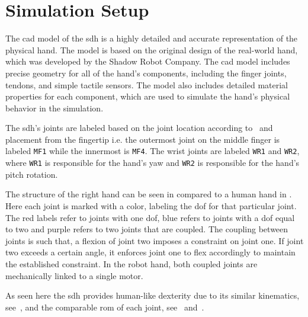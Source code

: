 \section{Simulation Setup}\label{sec:system-setup-simulation-setup}

The \gls{cad} model of the \gls{sdh} is a highly detailed and accurate representation of the physical hand. The model is based on the original design of the real-world hand, which was developed by the Shadow Robot Company. The \gls{cad} model includes precise geometry for all of the hand's components, including the finger joints, tendons, and simple tactile sensors. The model also includes detailed material properties for each component, which are used to simulate the hand's physical behavior in the simulation.\medskip

The \gls{sdh}'s joints are labeled based on the joint location according to~ and placement from the fingertip i.e. the outermost joint on the middle finger is labeled \texttt{MF1} while the innermost is \texttt{MF4}. The wrist joints are labeled \texttt{WR1} and \texttt{WR2}, where \texttt{WR1} is responsible for the hand's yaw and \texttt{WR2} is responsible for the hand's pitch rotation. \medskip

The structure of the right hand can be seen in  compared to a human hand in . Here each joint is marked with a color, labeling the \gls{dof} for that particular joint. The red labels refer to joints with one \gls{dof}, blue refers to joints with a \gls{dof} equal to two and purple refers to two joints that are coupled. The coupling between joints is such that, a flexion of joint two imposes a constraint on joint one. If joint two exceeds a certain angle, it enforces joint one to flex accordingly to maintain the established constraint. In the robot hand, both coupled joints are mechanically linked to a single motor. \medskip

As seen here the \gls{sdh} provides human-like dexterity due to its similar kinematics, see~, and the comparable \gls{rom} of each joint, see~ and~. \medskip

